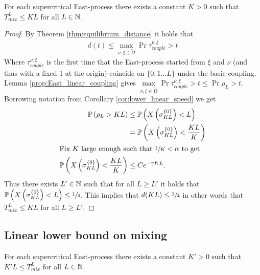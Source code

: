 \begin{theorem}
For each supercritical East-process there exists a constant $K > 0$ such that $T^L_{mix} \leq KL$ for all $L \in \mathbb{N}$. 
\end{theorem}

\begin{proof}
By Theorem \ref{thm:equilibrium_distance} it holds that 
\begin{align}
d(t) \leq \max\limits_{\nu, \xi \in \widetilde{\Omega}} \Pr{ \tau^{\nu, \xi}_{couple} > t }
\end{align}
Where $\tau^{\nu, \xi}_{couple}$ is the first time that the East-process started from $\xi$ and $\nu$ (and thus with a fixed 1 at the origin) coincide on $\{0, 1 ... L\}$ under the basic coupling. Lemma \ref{prop:East_linear_coupling} gives $\max\limits_{\nu, \xi \in \widetilde{\Omega}} \Pr{\tau^{\nu, \xi}_{couple} > t } \leq \Pr{\rho_L > t}$. Borrowing notation from Corollary \ref{cor:lower_linear_speed} we get 
\begin{align*}
\mathbb{P} \left( \rho_L > KL \right) &\leq \mathbb{P} \left( X\left(\sigma^{\{0\}}_{KL}\right) < L \right) \\
                 &= \mathbb{P} \left( X\left(\sigma^{\{0\}}_{KL}\right) < \frac{KL}{K} \right) \\
  \intertext{Fix $K$ large enough such that $\sfrac{1}{K} < \alpha$ to get}
                \mathbb{P} \left( X\left(\sigma^{\{0\}}_{KL}\right) < \frac{KL}{K} \right) &\leq C e^{-\gamma K L}. 
\end{align*}
Thus there exists $L' \in \mathbb{N}$ such that for all $L \geq L'$ it holds that $\mathbb{P} \left( X\left(\sigma^{\{0\}}_{KL} \right) < L \right) \leq \sfrac{1}{4}$. This implies that $d(KL) \leq \sfrac{1}{4}$ in other words that $T^L_{mix} \leq KL$ for all $L \geq L'$. 
\end{proof}

\subsection{Linear lower bound on mixing}
\begin{theorem}
For each supercritical East-process there exists a constant $K' > 0$ such that $K'L \leq T^L_{mix}$ for all $L \in \mathbb{N}$. 
\end{theorem}

